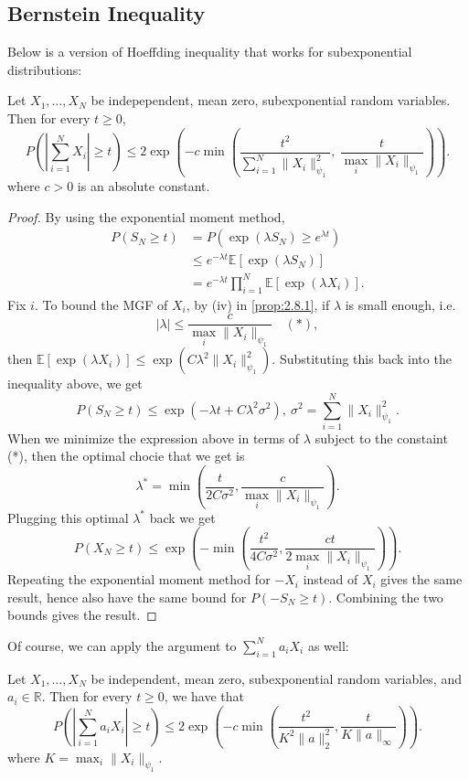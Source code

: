 \subsection{Bernstein Inequality}
Below is a version of Hoeffding inequality that works for subexponential distributions:

\begin{theorem}
\label{thm:2.9.1}
Let $X_1, \dots, X_N$ be indepependent, mean zero, subexponential random variables. Then for every $t \geq 0$, 
\[ P \left( \left| \sum_{i = 1}^{N} X_i \right| \geq t \right) 
\leq 2\exp{\left( -c \min_{} \left( \frac{t^2}{\sum_{i = 1}^{N} \lVert X_i \rVert_{\psi_1}^2}, \
\frac{t}{\max_{i} \lVert X_i \rVert_{\psi_1}} \right) \right)}. \]
where $c > 0$ is an absolute constant.
\end{theorem}

\begin{proof}
By using the exponential moment method, 
\begin{align*}
	P(S_N \geq t) 
	&= P(\exp{(\lambda S_N)} \geq e^{\lambda t}) \\
	&\leq e^{-\lambda t} \mathbb{E}[\exp{(\lambda S_N)}] \\
	&= e^{-\lambda t} \prod_{i = 1}^{N} \mathbb{E}[\exp{(\lambda X_i)}].
\end{align*}
Fix $i$. To bound the MGF of $X_i$, by (iv) in \cref{prop:2.8.1}, if $\lambda$ is small enough, i.e. 
\[ |\lambda| \leq \frac{c}{\max_{i} \lVert X_i \rVert_{\psi_1}} \quad (*), \]
then $\mathbb{E}[\exp{(\lambda X_i)}] \leq \exp{(C \lambda^2 \lVert X_i \rVert_{\psi_1}^2)}$. Substituting 
this back into the inequality above, we get 
\[ P(S_N \geq t) \leq \exp{(-\lambda t + C \lambda^2 \sigma^2)}, \ \sigma^2 = \sum_{i = 1}^{N} 
\lVert X_i \rVert_{\psi_1}^2. \]
When we minimize the expression above in terms of $\lambda$ subject to the constaint (*), then the optimal 
chocie that we get is 
\[ \lambda^* = \min \left( \frac{t}{2C \sigma^2}, \frac{c}{\max_{i} \lVert X_i \rVert_{\psi_1}} \right). \]
Plugging this optimal $\lambda^*$ back we get 
\[ P(X_N \geq t) \leq \exp{\left( -\min \left( \frac{t^2}{4C \sigma^2}, 
\frac{ct}{2 \max_{i} \lVert X_i \rVert_{\psi_1}} \right) \right)}. \]
Repeating the exponential moment method for $-X_i$ instead of $X_i$ gives the same result, hence also have the 
same bound for $P(-S_N \geq t)$. Combining the two bounds gives the result.
\end{proof}

Of course, we can apply the argument to $\sum_{i = 1}^{N} a_iX_i$ as well:
\begin{corollary}
\label{cor:2.9.2}
Let $X_1, \dots, X_N$ be independent, mean zero, subexponential random variables, and $a_i \in \mathbb{R}$. 
Then for every $t \geq 0$, we have that 
\[ P \left( \left| \sum_{i = 1}^{N} a_iX_i \right| \geq t \right) 
\leq 2\exp{\left( -c \min \left( \frac{t^2}{K^2 \lVert a \rVert_{2}^2}, 
\frac{t}{K \lVert a \rVert_{\infty}} \right) \right)}. \]
where $K = \max_{i} \lVert X_i \rVert_{\psi_1}$.
\end{corollary}

